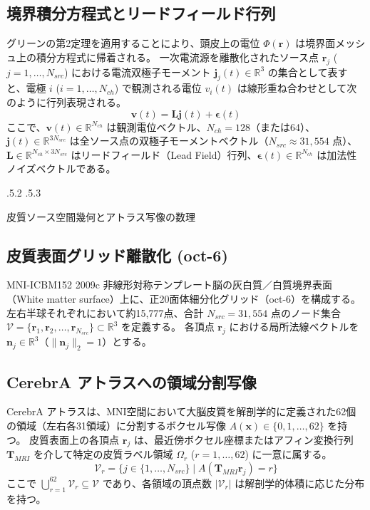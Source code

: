 \documentclass[platex,dvipdfmx,12pt]{jsarticle}
\makeatletter
\renewcommand{\section}{%
  \clearpage
  \@startsection{section}{1}{\z@}%
  {\Cvs \@plus.5\Cdp \@minus.2\Cdp}%
  {.5\Cvs \@plus.3\Cdp}%
  {\normalfont\LARGE\headfont\raggedright}%
}
\makeatother
\begin{document}
\subsection{境界積分方程式とリードフィールド行列}
グリーンの第2定理を適用することにより、頭皮上の電位 $\Phi(\mathbf{r})$ は境界面メッシュ上の積分方程式に帰着される。
一次電流源を離散化されたソース点 $\mathbf{r}_j$ ($j=1, \dots, N_{src}$) における電流双極子モーメント $\mathbf{j}_j(t) \in \mathbb{R}^3$ の集合として表すと、電極 $i$ ($i=1, \dots, N_{ch}$) で観測される電位 $v_i(t)$ は線形重ね合わせとして次のように行列表現される。
\begin{equation}
  \mathbf{v}(t) = \mathbf{L} \mathbf{j}(t) + \boldsymbol{\epsilon}(t)
  \label{eq:forward_model}
\end{equation}
ここで、$\mathbf{v}(t) \in \mathbb{R}^{N_{ch}}$ は観測電位ベクトル、$N_{ch} = 128$（または64）、$\mathbf{j}(t) \in \mathbb{R}^{3 N_{src}}$ は全ソース点の双極子モーメントベクトル（$N_{src} \approx 31,554$ 点）、$\mathbf{L} \in \mathbb{R}^{N_{ch} \times 3 N_{src}}$ はリードフィールド（Lead Field）行列、$\boldsymbol{\epsilon}(t) \in \mathbb{R}^{N_{ch}}$ は加法性ノイズベクトルである。

\section{皮質ソース空間幾何とアトラス写像の数理}

\subsection{皮質表面グリッド離散化 (oct-6)}
MNI-ICBM152 2009c 非線形対称テンプレート脳の灰白質／白質境界表面（White matter surface）上に、正20面体細分化グリッド（oct-6）を構成する。
左右半球それぞれにおいて約15,777点、合計 $N_{src} = 31,554$ 点のノード集合 $\mathcal{V} = \{\mathbf{r}_1, \mathbf{r}_2, \dots, \mathbf{r}_{N_{src}}\} \subset \mathbb{R}^3$ を定義する。
各頂点 $\mathbf{r}_j$ における局所法線ベクトルを $\mathbf{n}_j \in \mathbb{R}^3$（$\|\mathbf{n}_j\|_2 = 1$）とする。

\subsection{CerebrA アトラスへの領域分割写像}
CerebrA アトラスは、MNI空間において大脳皮質を解剖学的に定義された62個の領域（左右各31領域）に分割するボクセル写像 $A(\mathbf{x}) \in \{0, 1, \dots, 62\}$ を持つ\cite{manera2020cerebra}。
皮質表面上の各頂点 $\mathbf{r}_j$ は、最近傍ボクセル座標またはアフィン変換行列 $\mathbf{T}_{MRI}$ を介して特定の皮質ラベル領域 $\Omega_r$ ($r = 1, \dots, 62$) に一意に属する。
\begin{equation}
  \mathcal{V}_r = \{ j \in \{1, \dots, N_{src}\} \mid A(\mathbf{T}_{MRI} \mathbf{r}_j) = r \}
  \label{eq:cerebra_parcellation}
\end{equation}
ここで $\bigcup_{r=1}^{62} \mathcal{V}_r \subseteq \mathcal{V}$ であり、各領域の頂点数 $|\mathcal{V}_r|$ は解剖学的体積に応じた分布を持つ。
\end{document}
